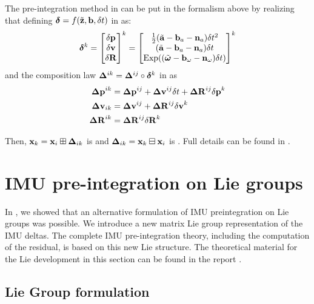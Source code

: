 The pre-integration method in  \cite{forster2017-TRO} can be put in the formalism above by realizing that defining 
$\bm\delta=f(\tilde{{\bf z}},{\bf b},\delta t)$ in  as:
%
\begin{align}
    \bm\delta^k = \begin{bmatrix}
    \delta{\bf p}\\\delta{\bf v}\\\delta{\bf R}
    \end{bmatrix}^k =
    \begin{bmatrix}
    \tfrac12(\tilde{{\bf a}}-{\bf b}_a-{\bf n}_a)\delta t^2 \\
    (\tilde{{\bf a}}-{\bf b}_a-{\bf n}_a)\delta t \\
    \operatorname*{Exp}((\tilde{{\bm \omega}}-{\bf b}_\omega-{\bf n}_\omega)\delta t)
    \end{bmatrix}^k
\end{align}
%
and the composition law ${\bm \Delta}^{ik}={\bm \Delta}^{ij}\circ\bm\delta^k$ in  as
%
\begin{align} \label{eq:composition_delta}
    \begin{split}
    {\bm \Delta {\bf p}}^{ik} 
    &= {\bm \Delta {\bf p}}^{ij} + {\bm \Delta {\bf v}}^{ij}\delta t + {\bm \Delta {\bf R}}^{ij}{\delta{\bf p}}^{k} \\
    {\bm \Delta {\bf v}}_{ik} 
    &= {\bm \Delta {\bf v}}^{ij} + {\bm \Delta {\bf R}}^{ij}{\delta{\bf v}}^{k} \\
    {\bm \Delta {\bf R}}^{ik} 
    &= {\bm \Delta {\bf R}}^{ij}{\delta{\bf R}}^{k} 
    \end{split}
\end{align}

Then, ${\bf x}_k={\bf x}_i\boxplus{\bm \Delta}_{ik}$ is \cite[eq.~32]{forster2017-TRO} and ${\bm \Delta}_{ik}={\bf x}_k\boxminus{\bf x}_i$ is \cite[eq.~33]{forster2017-TRO}. 
Full details can be found in \cite[Section 3.4]{atchuthan-18-thesis}.



%
%
%
%
\section{IMU pre-integration on Lie groups}
In \cite{fourmy2019absolute}, we showed that an alternative formulation of IMU preintegration on Lie groups was possible.
We introduce a new matrix Lie group representation of the IMU deltas. The complete IMU pre-integration theory,
including the computation of the residual, is based on this new Lie structure. The theoretical material for the Lie
development in this section can be found in the report \cite{sola2018micro}.

\subsection{Lie Group formulation}

